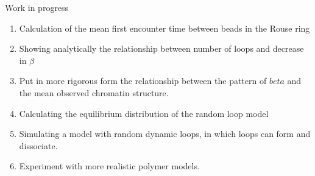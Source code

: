 \documentclass[8pt]{beamer}
\begin{document}
\begin{frame}{Work in progress}
\begin{enumerate}
\item Calculation of the mean first encounter time between beads in the Rouse ring
\item Showing analytically the relationship between number of loops and decrease in $\beta$
\item Put in more rigorous form the relationship between the pattern of $beta$ and the mean observed chromatin structure.
\item Calculating the equilibrium distribution of the random loop model
\item Simulating a model with random dynamic loops, in which loops can form and dissociate.
\item Experiment with more realistic polymer models.
\end{enumerate}
\end{frame}
\end{document}
